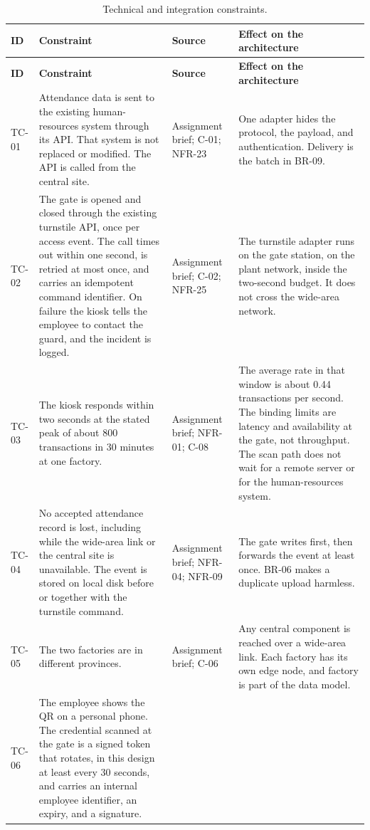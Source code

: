 \begin{longtable}{@{}L{1.25cm}L{5.15cm}L{4.05cm}L{4.15cm}@{}}
\caption{Technical and integration constraints.}
\label{tab:tc}\\
\toprule
\textbf{ID} & \textbf{Constraint} & \textbf{Source} & \textbf{Effect on the architecture}\\
\midrule
\endfirsthead
\toprule
\textbf{ID} & \textbf{Constraint} & \textbf{Source} & \textbf{Effect on the architecture}\\
\midrule
\endhead
TC-01 &
Attendance data is sent to the existing human-resources system through its API.
That system is not replaced or modified.
The API is called from the central site. &
Assignment brief; C-01; NFR-23 &
One adapter hides the protocol, the payload, and authentication.
Delivery is the batch in BR-09.\\
\addlinespace
TC-02 &
The gate is opened and closed through the existing turnstile API, once per access event.
The call times out within one second, is retried at most once, and carries an idempotent command identifier.
On failure the kiosk tells the employee to contact the guard, and the incident is logged. &
Assignment brief; C-02; NFR-25 &
The turnstile adapter runs on the gate station, on the plant network, inside the two-second budget.
It does not cross the wide-area network.\\
\addlinespace
TC-03 &
The kiosk responds within two seconds at the stated peak of about 800 transactions in 30 minutes at one factory. &
Assignment brief; NFR-01; C-08 &
The average rate in that window is about 0.44 transactions per second.
The binding limits are latency and availability at the gate, not throughput.
The scan path does not wait for a remote server or for the human-resources system.\\
\addlinespace
TC-04 &
No accepted attendance record is lost, including while the wide-area link or the central site is unavailable.
The event is stored on local disk before or together with the turnstile command. &
Assignment brief; NFR-04; NFR-09 &
The gate writes first, then forwards the event at least once.
BR-06 makes a duplicate upload harmless.\\
\addlinespace
TC-05 &
The two factories are in different provinces. &
Assignment brief; C-06 &
Any central component is reached over a wide-area link.
Each factory has its own edge node, and factory is part of the data model.\\
\addlinespace
TC-06 &
The employee shows the QR on a personal phone.
The credential scanned at the gate is a signed token that rotates, in this design at least every 30 seconds, and carries an internal employee identifier, an expiry, and a signature.

\end{longtable}

